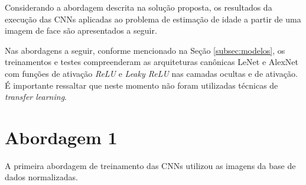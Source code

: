 
Considerando a abordagem descrita na solução proposta, os resultados da execução das CNNs aplicadas ao problema de estimação de idade a partir de uma imagem de face são apresentados a seguir.

%

Nas abordagens a seguir, conforme mencionado na Seção \ref{subsec:modelos}, os treinamentos e testes compreenderam as arquiteturas canônicas LeNet e AlexNet com funções de ativação \emph{ReLU} e \emph{Leaky ReLU} nas camadas ocultas e de ativação. É importante ressaltar que neste momento não foram utilizadas técnicas de \emph{transfer learning}.

\section{Abordagem 1}%
	A primeira abordagem de treinamento das CNNs utilizou as imagens da base de dados normalizadas.


